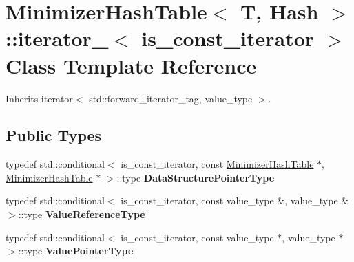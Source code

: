 \hypertarget{classMinimizerHashTable_1_1iterator__}{}\section{Minimizer\+Hash\+Table$<$ T, Hash $>$\+:\+:iterator\+\_\+$<$ is\+\_\+const\+\_\+iterator $>$ Class Template Reference}
\label{classMinimizerHashTable_1_1iterator__}


Inherits iterator$<$ std\+::forward\+\_\+iterator\+\_\+tag, value\+\_\+type $>$.

\subsection*{Public Types}
\begin{DoxyCompactItemize}
\item 
\mbox{\label{classMinimizerHashTable_1_1iterator___a1419092067dc70321e463c0275bda713}} 
typedef std\+::conditional$<$ is\+\_\+const\+\_\+iterator, const \hyperlink{structMinimizerHashTable}{Minimizer\+Hash\+Table} $\ast$, \hyperlink{structMinimizerHashTable}{Minimizer\+Hash\+Table} $\ast$ $>$\+::type {\bfseries Data\+Structure\+Pointer\+Type}
\item 
\mbox{\label{classMinimizerHashTable_1_1iterator___a27510afe2c8a46cf10141fc2237d1ca5}} 
typedef std\+::conditional$<$ is\+\_\+const\+\_\+iterator, const value\+\_\+type \&, value\+\_\+type \& $>$\+::type {\bfseries Value\+Reference\+Type}
\item 
\mbox{\label{classMinimizerHashTable_1_1iterator___a8d6be0678d79effcd5162c7b45698bb3}} 
typedef std\+::conditional$<$ is\+\_\+const\+\_\+iterator, const value\+\_\+type $\ast$, value\+\_\+type $\ast$ $>$\+::type {\bfseries Value\+Pointer\+Type}
\end{DoxyCompactItemize}
